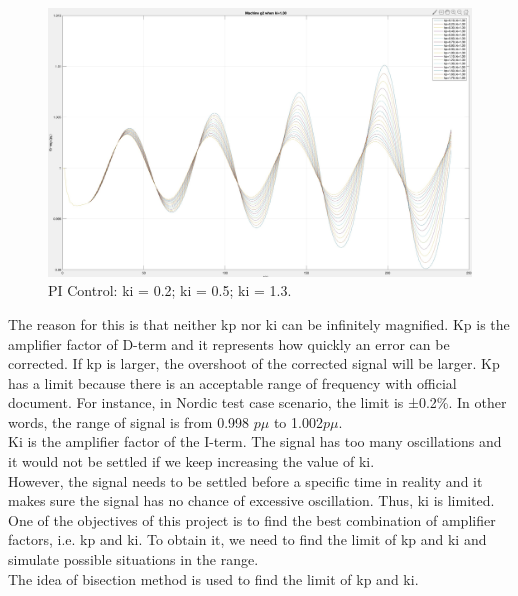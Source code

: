 \begin{figure}[!htbp]
%
  \includegraphics[width= \linewidth]{figure/3_4_1_tune_ki_3.jpeg}
\endminipage
\caption{PI Control: ki = 0.2; ki = 0.5; ki = 1.3.}
\label{3_4_1_larger_ki}
\end{figure}


The reason for this is that neither kp nor ki can be infinitely magnified. Kp is the amplifier factor of D-term and it represents how quickly an error can be corrected. If kp is larger, the overshoot of the corrected signal will be larger. Kp has a limit because there is an acceptable range of frequency with official document. For instance, in Nordic test case scenario, the limit is ±0.2\%. In other words, the range of signal is from 0.998 $p\mu$ to 1.002$p\mu$. \\

Ki is the amplifier factor of the I-term. The signal has too many oscillations and it would not be settled if we keep increasing the value of ki.\\

However, the signal needs to be settled before a specific time in reality and it makes sure the signal has no chance of excessive oscillation. Thus, ki is limited. \\

One of the objectives of this project is to find the best combination of amplifier factors, i.e. kp and ki. To obtain it, we need to find the limit of kp and ki and simulate possible situations in the range.\\

The idea of bisection method is used to find the limit of kp and ki. 

